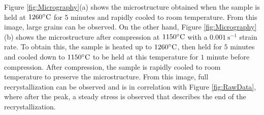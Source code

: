 \documentclass[metals,article,submit,pdftex,moreauthors]{Definitions/mdpi}
\begin{document}
Figure \ref{fig:Micrography}(a) shows the microstructure obtained when the sample is held at $1260\celsius$ for $5$ minutes and rapidly cooled to room temperature. From this image, large grains can be observed.
On the other hand, Figure \ref{fig:Micrography}(b) shows the microstructure after compression at $1150\celsius$ with a $0.001~\text{s}^{-1}$ strain rate.
To obtain this, the sample is heated up to $1260\celsius$, then held for $5$ minutes and cooled down to $1150\celsius$ to be held at this temperature for $1$ minute before compression.
After compression, the sample is rapidly cooled to room temperature to preserve the microstructure.
From this image, full recrystallization can be observed and is in correlation with Figure \ref{fig:RawData}, where after the peak, a steady stress is observed that describes the end of the recrystallization.
\end{document}
